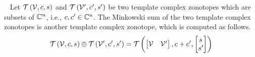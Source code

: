 \begin{lemma}~\label{lem:min-sum}
Let $\mathit{\operatorname{\mathcal{T}}}\left(\mathcal{V},c,s\right)$ and
$\mathit{\operatorname{\mathcal{T}}}\left(\mathcal{V}^\prime,c^\prime,s^\prime\right)$ be two template complex
zonotopes which are subsets of $\mathbb{C}^n$, i.e.,
$c,c^\prime\in\mathbb{C}^n$.  The Minkowski sum of the two
template complex zonotopes is another template complex zonotope,
which is computed as follows.
%
\begin{equation}
\mathit{\operatorname{\mathcal{T}}}\left(\mathcal{V},c,s\right)\oplus \mathit{\operatorname{\mathcal{T}}}\left(\mathcal{V}^\prime,c^\prime,s^\prime\right)
= \mathit{\operatorname{\mathcal{T}}}\left(\begin{bmatrix}\mathcal{V} & \mathcal{V}^\prime\end{bmatrix},c+c^\prime,\begin{bmatrix}s\\s^\prime\end{bmatrix}\right)
\end{equation}
\end{lemma}
%
